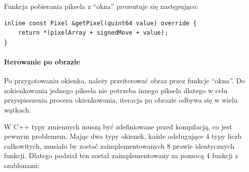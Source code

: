 \par
Funkcja pobierania piksela z \enquote{okna} prezentuje się następująco:
\begin{lstlisting}
inline const Pixel &getPixel(quint64 value) override {
    return *(pixelArray + signedMove + value);
}
\end{lstlisting}

\paragraph{Iterowanie po obrazie}
\par
Po przygotowaniu okienka, należy przeiterować obraz przez funkcje \enquote{okna}.
Do zokienkowania jednego piksela nie potrzeba innego piksela dlatego w celu przyspieszenia procesu okienkowania, iteracja po obrazie odbywa się w wielu wątkach.
\par
W C++ typy zmiennych muszą być zdefiniowane przed kompilacją, co jest pewnym problemem.
Mając dwa typy okienek, każde odsługujące 4 typy liczb całkowitych, musiało by zostać zaimplementowanych 8 prawie identycznych funkcji.
Dlatego podział ten został zaimplementowany za pomocą 4 funkcji z szablonami:
